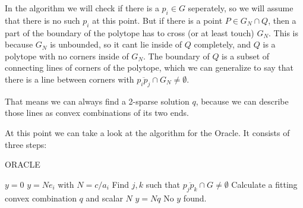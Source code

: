 \documentclass[11pt,a4paper]{scrartcl}
\newcommand{\R}{\mathbb{R}}
\begin{document}
{

\begin{wrapfigure}{r}{6cm}
\end{wrapfigure}

In the algorithm we will check if there is a $p_i\in G$ seperately, so we will assume that there is no such $p_i$ at this point. But if there is a point $P\in G_N\cap Q$,	then a part of the boundary of the polytope has to cross (or at least touch) $G_N$. This is because $G_N$ is unbounded, so it cant lie inside of $Q$ completely, and $Q$ is a polytope with no corners inside of $G_N$. The boundary of $Q$ is a subset of connecting lines of corners of the polytope, which we can generalize to say that there is a line between corners with $\overline{p_i p_j}\cap G_N\neq\emptyset$.

That means we can always find a 2-sparse solution $q$, because we can describe those lines as convex combinations of its two ends.

}

\vspace{1cm}

At this point we can take a look at the algorithm for the Oracle. It consists of three steps:

\begin{algorithm}
\caption{ORACLE}
\begin{algorithmic}
	\Comment{Step 1: Check if $G$ is all of $\R^2$}
    \State \Return $y=0$
    \State \Return $y=Ne_i$ with $N=c/a_i$
\Else
	\State Find $j,k$ such that $\overline{p_j p_k}\cap G\neq \emptyset$
		\State Calculate a fitting convex combination $q$ and scalar $N$
		\State \Return $y=Nq$
	\Else
		\State \Return	No $y$ found.
	\EndIf
\EndIf
\end{algorithmic}
\end{algorithm}
\end{document}
